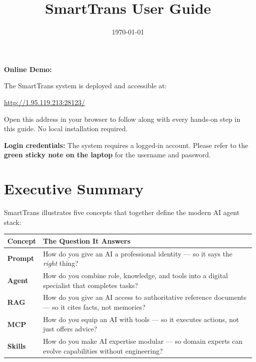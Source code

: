\documentclass[
  paper=a4,
  fontsize=10pt,
  DIV=14,
  headings=normal,
  headsepline=true,
  parskip=half,
]{scrartcl}
\title{SmartTrans User Guide}
\date{\today}
\author{}
\begin{document}
\maketitle

\begin{tcolorbox}[
  colback=black!8, colframe=black!60,
  leftrule=4pt, rightrule=0pt, toprule=0pt, bottomrule=0pt,
  arc=0pt, outer arc=0pt,
  before skip=12pt, after skip=16pt,
  left=12pt, right=12pt, top=8pt, bottom=8pt,
]
  \textbf{Online Demo:}\par
  The SmartTrans system is deployed and accessible at:\par
  \medskip
  \begin{center}
    \large\url{http://1.95.119.213:28123/}
  \end{center}
  \smallskip
  \small Open this address in your browser to follow along with every hands-on step in this guide. No local installation required.
\end{tcolorbox}

\begin{tipbox}
  \textbf{Login credentials:} The system requires a logged-in account. Please refer to the \textbf{green sticky note on the laptop} for the username and password.
\end{tipbox}

\section{Executive Summary}

SmartTrans illustrates five concepts that together define the modern AI agent stack:

\medskip
\begin{tabularx}{\textwidth}{@{} l L @{}}
\toprule

\textbf{Concept} & \textbf{The Question It Answers} \\
\midrule
\textbf{Prompt}  & How do you give an AI a professional identity — so it says the \emph{right} thing? \\
\textbf{Agent}   & How do you combine role, knowledge, and tools into a digital specialist that completes tasks? \\
\textbf{RAG}     & How do you give an AI access to authoritative reference documents — so it cites facts, not memories? \\
\textbf{MCP}     & How do you equip an AI with tools — so it executes actions, not just offers advice? \\
\textbf{Skills}  & How do you make AI expertise modular — so domain experts can evolve capabilities without engineering? \\
\bottomrule
\end{tabularx}
\medskip
\end{document}
